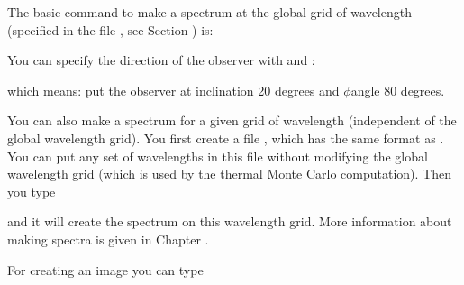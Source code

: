 \documentclass[letterpaper,10pt,english]{sphinxmanual}
\begin{document}
The basic command to make a spectrum at the global grid of wavelength
(specified in the file ,
see Section {\hyperref[\detokenize{inputoutputfiles:sec-wavelengths}]{}}) is:

\begin{sphinxVerbatim}[commandchars=\\\{\}]
 
\end{sphinxVerbatim}

You can specify the direction of the observer with  and :

\begin{sphinxVerbatim}[commandchars=\\\{\}]
     
\end{sphinxVerbatim}

which means: put the observer at inclination 20 degrees and \(\phi\)\sphinxhyphen{}angle
80 degrees.

You can also make a spectrum for a given grid of wavelength (independent of the
global wavelength grid). You first create a file
, which has the same format as
. You can put any set of wavelengths in this file
without modifying the global wavelength grid (which is used by the thermal Monte
Carlo computation). Then you type

\begin{sphinxVerbatim}[commandchars=\\\{\}]
  
\end{sphinxVerbatim}

and it will create the spectrum on this wavelength grid. More information about
making spectra is given in Chapter {\hyperref[\detokenize{imagesspectra:chap-images-spectra}]{}}.

For creating an image you can type

\begin{sphinxVerbatim}[commandchars=\\\{\}]
   
\end{sphinxVerbatim}
\end{document}
